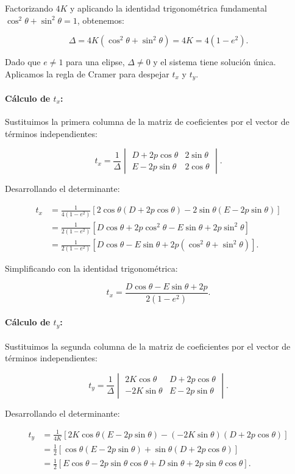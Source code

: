 \documentclass[12pt, a4paper]{article}
\begin{document}
Factorizando $4K$ y aplicando la identidad trigonométrica fundamental $\cos^2\theta + \sin^2\theta = 1$, obtenemos:

$$
\Delta = 4K(\cos^2\theta + \sin^2\theta) = 4K = 4(1-e^2).
$$

Dado que $e \neq 1$ para una elipse, $\Delta \neq 0$ y el sistema tiene solución única. Aplicamos la regla de Cramer para despejar $t_x$ y $t_y$.

\paragraph{Cálculo de $t_x$:}
Sustituimos la primera columna de la matriz de coeficientes por el vector de términos independientes:

$$
t_x = \frac{1}{\Delta} \begin{vmatrix} D + 2p\cos\theta & 2\sin\theta \\ E - 2p\sin\theta & 2\cos\theta \end{vmatrix}.
$$

Desarrollando el determinante:

$$
\begin{aligned}
t_x &= \frac{1}{4(1-e^2)} \left[ 2\cos\theta(D + 2p\cos\theta) - 2\sin\theta(E - 2p\sin\theta) \right] \\
&= \frac{1}{2(1-e^2)} \left[ D\cos\theta + 2p\cos^2\theta - E\sin\theta + 2p\sin^2\theta \right] \\
&= \frac{1}{2(1-e^2)} \left[ D\cos\theta - E\sin\theta + 2p(\cos^2\theta + \sin^2\theta) \right].
\end{aligned}
$$

Simplificando con la identidad trigonométrica:

$$
t_x = \frac{D\cos\theta - E\sin\theta + 2p}{2(1-e^2)}.
$$

\paragraph{Cálculo de $t_y$:}
Sustituimos la segunda columna de la matriz de coeficientes por el vector de términos independientes:

$$
t_y = \frac{1}{\Delta} \begin{vmatrix} 2K\cos\theta & D + 2p\cos\theta \\ -2K\sin\theta & E - 2p\sin\theta \end{vmatrix}.
$$

Desarrollando el determinante:

$$
\begin{aligned}
t_y &= \frac{1}{4K} \left[ 2K\cos\theta(E - 2p\sin\theta) - (-2K\sin\theta)(D + 2p\cos\theta) \right] \\
&= \frac{1}{2} \left[ \cos\theta(E - 2p\sin\theta) + \sin\theta(D + 2p\cos\theta) \right] \\
&= \frac{1}{2} \left[ E\cos\theta - 2p\sin\theta\cos\theta + D\sin\theta + 2p\sin\theta\cos\theta \right].
\end{aligned}
$$
\end{document}
